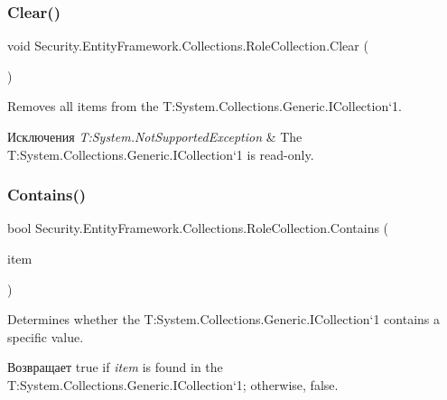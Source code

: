 \subsubsection{\texorpdfstring{Clear()}{Clear()}}
{\footnotesize\ttfamily void Security.\+Entity\+Framework.\+Collections.\+Role\+Collection.\+Clear (\begin{DoxyParamCaption}{ }\end{DoxyParamCaption})}



Removes all items from the T\+:\+System.\+Collections.\+Generic.\+I\+Collection`1. 


\begin{DoxyExceptions}{Исключения}
{\em T\+:\+System.\+Not\+Supported\+Exception} & The T\+:\+System.\+Collections.\+Generic.\+I\+Collection`1 is read-\/only. \\
\hline
\end{DoxyExceptions}
\mbox{\label{class_security_1_1_entity_framework_1_1_collections_1_1_role_collection_af4f03ba2754a9a7a1c56cf2d86e4396a}} 
\subsubsection{\texorpdfstring{Contains()}{Contains()}}
{\footnotesize\ttfamily bool Security.\+Entity\+Framework.\+Collections.\+Role\+Collection.\+Contains (\begin{DoxyParamCaption}\item[{\hyperlink{interface_security_1_1_interfaces_1_1_model_1_1_i_role}{I\+Role}}]{item }\end{DoxyParamCaption})}



Determines whether the T\+:\+System.\+Collections.\+Generic.\+I\+Collection`1 contains a specific value. 

\begin{DoxyReturn}{Возвращает}
true if {\itshape item}  is found in the T\+:\+System.\+Collections.\+Generic.\+I\+Collection`1; otherwise, false. 
\end{DoxyReturn}

